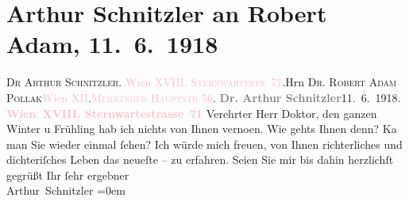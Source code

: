 

               \section[Arthur Schnitzler an Robert Adam, 11. 6. 1918]{ Arthur Schnitzler an Robert Adam, 11. 6. 1918}\nopagebreak{}\rehead{ }\normalsize\beginnumbering{} \toendnotes[C]{\smallbreak\pagebreak[2]} 
\pstart{}{\pb}\textsc{Dr Arthur Schnitzler}. \textcolor{pink}{Wien XVIII. \textsc{Sternwartestr} 71}{}\ledrightnote{\textcolor{pink}{VIII., Josefstadt}}.\pend{}{\bigskip}\pstart{}{\pb}Hrn \textsc{Dr. Robert Adam
                            Pollak}\pend{}\pstart{}\textcolor{pink}{Wien XII}{}\ledrightnote{\textcolor{pink}{XII., Meidling}}.\pend{}\pstart{}\textcolor{pink}{\textsc{Meidlinger Hauptstr} 56}{}\ledrightnote{\textcolor{pink}{Meidlinger Hauptstraße}}.\pend{}{\bigskip}\pstart
           \noindent{}{\pb}\textcolor{gray}{\textbf{Dr. Arthur Schnitzler}}\hfill 11. 6. 1918.\pend
           \pstart
           \textcolor{gray}{\textbf{\textcolor{pink}{Wien XVIII. Sternwartestrasse 71}{}\ledrightnote{\textcolor{pink}{Sternwartestraße}}}}\pend
           \pstart
           Verehrter Herr Doktor, den ganzen Winter u Frühling hab ich
                    nichts von Ihnen verno{\geminationm}en. Wie gehts Ihnen denn?
                        Ka{\geminationn} man Sie wieder einmal ſehen? Ich würde mich
                    freuen, von Ihnen richterliches und dichteriſches Leben \introOben{}das
                        neueſte –\introOben{} zu erfahren. Seien Sie {\pb}mir bis dahin herzlichſt
                    gegrüßt\pend
           \pstart
           Ihr ſehr ergebner{\\[\baselineskip]}\spacefill\mbox{Arthur Schnitzler}\pend
           \leftskip=0em{}\endnumbering{}  
      